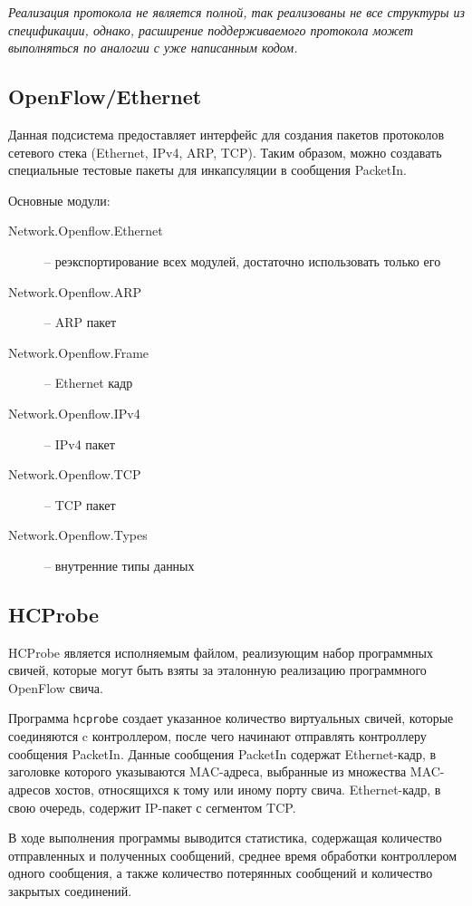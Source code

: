 \documentclass[9pt,a4paper]{article}
\begin{document}
\emph{Реализация протокола не является полной, так реализованы не все структуры
  из спецификации, однако, расширение поддерживаемого протокола может
  выполняться по аналогии с уже написанным кодом.}

\subsection{OpenFlow/Ethernet}

Данная подсистема предоставляет интерфейс для создания пакетов протоколов
сетевого стека (Ethernet, IPv4, ARP, TCP). Таким образом, можно создавать
специальные тестовые пакеты для инкапсуляции в сообщения PacketIn.

Основные модули:

\begin{description}
  \item[Network.Openflow.Ethernet] -- реэкспортирование всех модулей, достаточно
    использовать только его
  \item[Network.Openflow.ARP]      -- ARP пакет
  \item[Network.Openflow.Frame]    -- Ethernet кадр
  \item[Network.Openflow.IPv4]     -- IPv4 пакет
  \item[Network.Openflow.TCP]      -- TCP пакет
  \item[Network.Openflow.Types]    -- внутренние типы данных
\end{description}

\subsection{HCProbe}

HCProbe является исполняемым файлом, реализующим набор программных свичей,
которые могут быть взяты за эталонную реализацию программного OpenFlow свича.

Программа \texttt{hcprobe} создает указанное количество виртуальных свичей,
которые соединяются c контроллером, после чего начинают отправлять контроллеру
сообщения PacketIn.  Данные сообщения PacketIn содержат Ethernet-кадр, в
заголовке которого указываются MAC-адреса, выбранные из множества MAC-адресов
хостов, относящихся к тому или иному порту свича.  Ethernet-кадр, в свою
очередь, содержит IP-пакет с сегментом TCP.

В ходе выполнения программы выводится статистика, содержащая количество
отправленных и полученных сообщений, среднее время обработки контроллером одного
сообщения, а также количество потерянных сообщений и количество закрытых
соединений.
\end{document}
